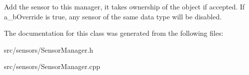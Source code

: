 Add the sensor to this manager, it takes ownership of the object if accepted. If a\+\_\+b\+Override is true, any sensor of the same data type will be disabled. 

The documentation for this class was generated from the following files\+:\begin{DoxyCompactItemize}
\item 
src/sensors/Sensor\+Manager.\+h\item 
src/sensors/Sensor\+Manager.\+cpp\end{DoxyCompactItemize}

